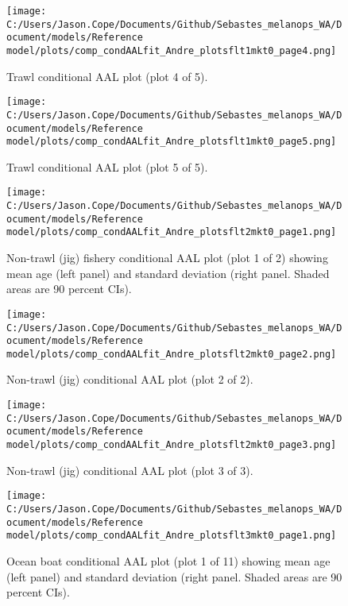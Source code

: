 \documentclass[11pt,
  letterpaper,
]{article}
\begin{document}
\begin{figure}
{\centering
\texttt{[image: C:/Users/Jason.Cope/Documents/Github/Sebastes\_melanops\_WA/Document/models/Reference model/plots/comp\_condAALfit\_Andre\_plotsflt1mkt0\_page4.png]}
}
\caption{Trawl conditional AAL plot (plot 4 of 5).\label{fig:comp_condAALfit_Andre_plotsflt1mkt0_page4}}
\end{figure}

\begin{figure}
{\centering
\texttt{[image: C:/Users/Jason.Cope/Documents/Github/Sebastes\_melanops\_WA/Document/models/Reference model/plots/comp\_condAALfit\_Andre\_plotsflt1mkt0\_page5.png]}
}
\caption{Trawl conditional AAL plot (plot 5 of 5).\label{fig:comp_condAALfit_Andre_plotsflt1mkt0_page5}}
\end{figure}

\begin{figure}
{\centering
\texttt{[image: C:/Users/Jason.Cope/Documents/Github/Sebastes\_melanops\_WA/Document/models/Reference model/plots/comp\_condAALfit\_Andre\_plotsflt2mkt0\_page1.png]}
}
\caption{Non-trawl (jig) fishery conditional AAL plot (plot 1 of 2) showing mean age (left panel) and standard deviation (right panel. Shaded areas are 90 percent CIs).\label{fig:comp_condAALfit_Andre_plotsflt2mkt0_page1}}
\end{figure}

\begin{figure}
{\centering
\texttt{[image: C:/Users/Jason.Cope/Documents/Github/Sebastes\_melanops\_WA/Document/models/Reference model/plots/comp\_condAALfit\_Andre\_plotsflt2mkt0\_page2.png]}
}
\caption{Non-trawl (jig) conditional AAL plot (plot 2 of 2).\label{fig:comp_condAALfit_Andre_plotsflt2mkt0_page2}}
\end{figure}

\begin{figure}
{\centering
\texttt{[image: C:/Users/Jason.Cope/Documents/Github/Sebastes\_melanops\_WA/Document/models/Reference model/plots/comp\_condAALfit\_Andre\_plotsflt2mkt0\_page3.png]}
}
\caption{Non-trawl (jig) conditional AAL plot (plot 3 of 3).\label{fig:comp_condAALfit_Andre_plotsflt2mkt0_page3}}
\end{figure}

\begin{figure}
{\centering
\texttt{[image: C:/Users/Jason.Cope/Documents/Github/Sebastes\_melanops\_WA/Document/models/Reference model/plots/comp\_condAALfit\_Andre\_plotsflt3mkt0\_page1.png]}
}
\caption{Ocean boat conditional AAL plot (plot 1 of 11) showing mean age (left panel) and standard deviation (right panel. Shaded areas are 90 percent CIs).\label{fig:comp_condAALfit_Andre_plotsflt3mkt0_page1}}
\end{figure}
\end{document}
